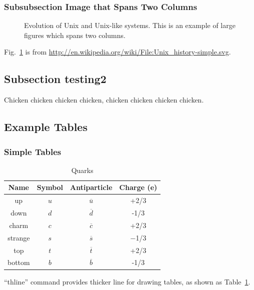 \documentclass{jcse}
\begin{document}
\subsubsection{Subsubsection Image that Spans Two Columns}

\begin{figure}
	\centering
	\caption{Evolution of Unix and Unix-like systems. This is an example
		of large figures which spans two columns.
	}
	\label{dia:unix}
\end{figure}

Fig.~\ref{dia:unix} is from \url{http://en.wikipedia.org/wiki/File:Unix_history-simple.svg}.

\subsection{Subsection testing2}
Chicken chicken chicken chicken,
chicken chicken chicken chicken.

\subsection{Example Tables}

\subsubsection{Simple Tables}

\begin{table}
\centering
\caption{Quarks}
\label{t:quarks}
\begin{tabular}{cccc}
\thline
Name     & Symbol & Antiparticle   & Charge (e) \\
\hline
up       & $u$    & $\overline{u}$ & +2/3       \\
down     & $d$    & $\overline{d}$ & -1/3       \\
charm    & $c$    & $\overline{c}$ & +2/3       \\
strange  & $s$    & $\overline{s}$ & −1/3       \\
top      & $t$    & $\overline{t}$ & +2/3       \\
bottom   & $b$    & $\overline{b}$ & -1/3       \\
\hline
\end{tabular}
\end{table}

``thline'' command provides thicker line for drawing tables,
as shown as Table~\ref{t:quarks}.
\end{document}

